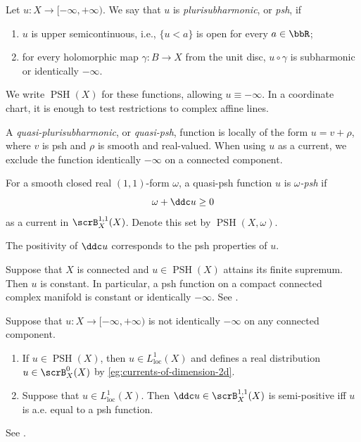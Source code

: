 \begin{definition}[label=\labelNFM{def:psh-function}, status=draft, tag=0000000]
	Let $u : X \to [-\infty,+\infty)$.
	We say that $u$ is \emph{plurisubharmonic}, or \emph{psh}, if
	\begin{enumerate}
		\item $u$ is upper semicontinuous, i.e., $\{u < a\}$ is open for every $a \in \bbR$;
		\item for every holomorphic map $\gamma : B \to X$ from the unit disc,
		      $u\circ\gamma$ is subharmonic or identically $-\infty$.
	\end{enumerate}
	We write $\operatorname{PSH}(X)$ for these functions, allowing $u \equiv -\infty$.
	In a coordinate chart, it is enough to test restrictions to complex affine lines.

	A \emph{quasi-plurisubharmonic}, or \emph{quasi-psh}, function is locally of the form $u = v + \rho$,
	where $v$ is psh and $\rho$ is smooth and real-valued.
	When using $u$ as a current, we exclude the function identically $-\infty$ on a connected component.

	For a smooth closed real $(1,1)$-form $\omega$, a quasi-psh function $u$ is \emph{$\omega$-psh} if
	\[ \omega + \ddc u \geq 0 \]
	as a current in $\scrB_X^{1,1}(X)$.
	Denote this set by $\operatorname{PSH}(X,\omega)$.
\end{definition}

The positivity of $\ddc u$ corresponds to the psh properties of $u$.

\begin{remark}[label=\labelNFM{rmk:maximum-principle-of-psh-functions}, status=draft, tag=0000000, title={Maximum principle}]
	Suppose that $X$ is connected and $u \in \operatorname{PSH}(X)$ attains its finite supremum.
	Then $u$ is constant.
	In particular, a psh function on a compact connected complex manifold is constant or identically $-\infty$.
	See \cite[Corollary~2.4.6]{Dinh-Sibony-2005-IntroductionTheoryCurrents}.
\end{remark}

\begin{proposition}[label=\labelNFM{prop:properties-of-psh-function}, status=draft, tag=0000000]
	Suppose that $u:X \to [-\infty,+\infty)$ is not identically $-\infty$ on any connected component.
	\begin{enumerate}
		\item If $u \in \operatorname{PSH}(X)$, then $u \in L^1_{\mathrm{loc}}(X)$ and defines a real distribution $u \in \scrB_X^0(X)$ by \cref{eg:currents-of-dimension-2d}.
		\item Suppose that $u \in L^1_{\mathrm{loc}}(X)$.
		      Then $\ddc u \in \scrB_X^{1,1}(X)$ is semi-positive iff $u$ is a.e. equal to a psh function.
  \end{enumerate}
	See \cite[Chapter~I, Theorems~4.17 and~5.8]{Demailly-2012-ComplexAnalyticDifferential}.
\end{proposition}

